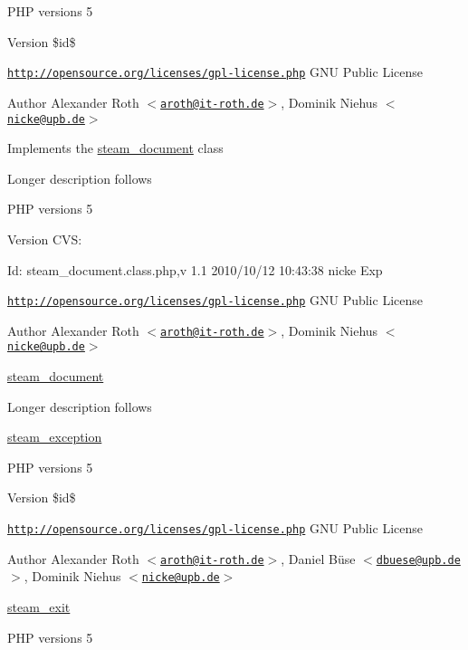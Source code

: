 PHP versions 5

\begin{DoxyVersion}{Version}
\$id\$
\end{DoxyVersion}
\href{http://opensource.org/licenses/gpl-license.php}{\tt http://opensource.org/licenses/gpl-\/license.php} GNU Public License \begin{DoxyAuthor}{Author}
Alexander Roth $<$\href{mailto:aroth@it-roth.de}{\tt aroth@it-\/roth.de}$>$, Dominik Niehus $<$\href{mailto:nicke@upb.de}{\tt nicke@upb.de}$>$
\end{DoxyAuthor}
Implements the \hyperlink{classsteam__document}{steam\_\-document} class

Longer description follows

PHP versions 5

\begin{DoxyVersion}{Version}
CVS: 
\end{DoxyVersion}
\begin{DoxyParagraph}{Id:}
steam\_\-document.class.php,v 1.1 2010/10/12 10:43:38 nicke Exp 
\end{DoxyParagraph}


\href{http://opensource.org/licenses/gpl-license.php}{\tt http://opensource.org/licenses/gpl-\/license.php} GNU Public License \begin{DoxyAuthor}{Author}
Alexander Roth $<$\href{mailto:aroth@it-roth.de}{\tt aroth@it-\/roth.de}$>$, Dominik Niehus $<$\href{mailto:nicke@upb.de}{\tt nicke@upb.de}$>$
\end{DoxyAuthor}
\hyperlink{classsteam__document}{steam\_\-document}

Longer description follows

\hyperlink{classsteam__exception}{steam\_\-exception}

PHP versions 5

\begin{DoxyVersion}{Version}
\$id\$
\end{DoxyVersion}
\href{http://opensource.org/licenses/gpl-license.php}{\tt http://opensource.org/licenses/gpl-\/license.php} GNU Public License \begin{DoxyAuthor}{Author}
Alexander Roth $<$\href{mailto:aroth@it-roth.de}{\tt aroth@it-\/roth.de}$>$, Daniel Büse $<$\href{mailto:dbuese@upb.de}{\tt dbuese@upb.de}$>$, Dominik Niehus $<$\href{mailto:nicke@upb.de}{\tt nicke@upb.de}$>$
\end{DoxyAuthor}
\hyperlink{classsteam__exit}{steam\_\-exit}

PHP versions 5

